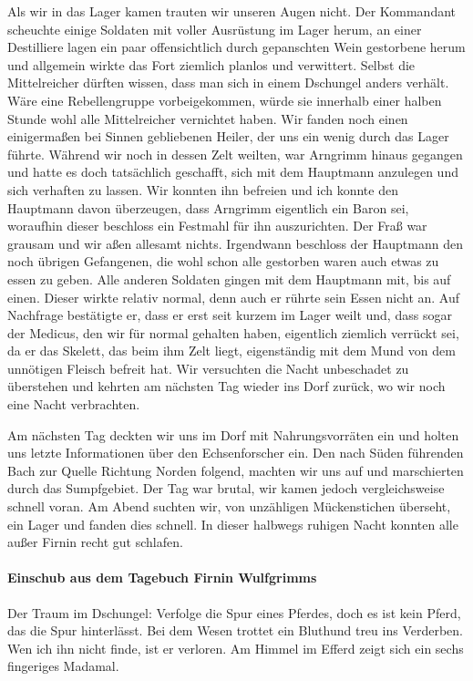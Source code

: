 Als wir in das Lager kamen trauten wir unseren Augen nicht. Der Kommandant scheuchte einige Soldaten mit voller Ausrüstung im Lager herum, an einer Destilliere lagen ein paar offensichtlich durch gepanschten Wein gestorbene herum und allgemein wirkte das Fort ziemlich planlos und verwittert. Selbst die Mittelreicher dürften wissen, dass man sich in einem Dschungel anders verhält. Wäre eine Rebellengruppe vorbeigekommen, würde sie innerhalb einer halben Stunde wohl alle Mittelreicher vernichtet haben. Wir fanden noch einen einigermaßen bei Sinnen gebliebenen Heiler, der uns ein wenig durch das Lager führte. Während wir noch in dessen Zelt weilten, war Arngrimm hinaus gegangen und hatte es doch tatsächlich geschafft, sich mit dem Hauptmann anzulegen und sich verhaften zu lassen. Wir konnten ihn befreien und ich konnte den Hauptmann davon überzeugen, dass Arngrimm eigentlich ein Baron sei, woraufhin dieser beschloss ein Festmahl für ihn auszurichten. Der Fraß war grausam und wir aßen allesamt nichts. Irgendwann beschloss der Hauptmann den noch übrigen Gefangenen, die wohl schon alle gestorben waren auch etwas zu essen zu geben. Alle anderen Soldaten gingen mit dem Hauptmann mit, bis auf einen. Dieser wirkte relativ normal, denn auch er rührte sein Essen nicht an. Auf Nachfrage bestätigte er, dass er erst seit kurzem im Lager weilt und, dass sogar der Medicus, den wir für normal gehalten haben, eigentlich ziemlich verrückt sei, da er das Skelett, das beim ihm Zelt liegt, eigenständig mit dem Mund von dem unnötigen Fleisch befreit hat. Wir versuchten die Nacht unbeschadet zu überstehen und kehrten am nächsten Tag wieder ins Dorf zurück, wo wir noch eine Nacht verbrachten. 

Am nächsten Tag deckten wir uns im Dorf mit Nahrungsvorräten ein und holten uns letzte Informationen über den Echsenforscher ein. Den nach Süden führenden Bach zur Quelle Richtung Norden folgend, machten wir uns auf und marschierten durch das Sumpfgebiet. Der Tag war brutal, wir kamen jedoch vergleichsweise schnell voran. Am Abend suchten wir, von unzähligen Mückenstichen überseht, ein Lager und fanden dies schnell. In dieser halbwegs ruhigen Nacht konnten alle außer Firnin recht gut schlafen.

\paragraph{Einschub aus dem Tagebuch Firnin Wulfgrimms} Der Traum im Dschungel:
Verfolge die Spur eines Pferdes, doch es ist kein Pferd, das die Spur
hinterlässt. Bei dem Wesen trottet ein Bluthund treu ins Verderben. Wen
ich ihn nicht finde, ist er verloren. Am Himmel im Efferd zeigt sich ein
sechs fingeriges Madamal.

